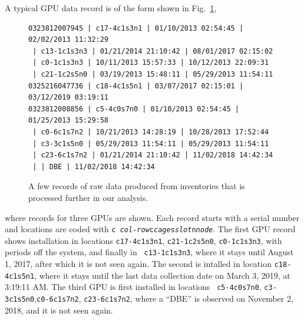 A typical GPU data record is of the form shown in Fig.~\ref{fig:dataraw},
\begin{figure}
{\small
\begin{verbatim}
0323812007945 | c17-4c1s3n1 | 01/10/2013 02:54:45 | 02/02/2013 11:32:29
 | c13-1c1s3n3 | 01/21/2014 21:10:42 | 08/01/2017 02:15:02
 | c0-1c1s3n3 | 10/11/2013 15:57:33 | 10/12/2013 22:09:31
 | c21-1c2s5n0 | 03/19/2013 15:48:11 | 05/29/2013 11:54:11
0325216047736 | c18-4c1s5n1 | 03/07/2017 02:15:01 | 03/12/2019 03:19:11
0323812008856 | c5-4c0s7n0 | 01/10/2013 02:54:45 | 01/25/2013 15:29:58
 | c0-6c1s7n2 | 10/21/2013 14:28:19 | 10/28/2013 17:52:44
 | c3-3c1s5n0 | 05/29/2013 11:54:11 | 05/29/2013 11:54:11
 | c23-6c1s7n2 | 01/21/2014 21:10:42 | 11/02/2018 14:42:34
 | | DBE | 11/02/2018 14:42:34
\end{verbatim}
}
\caption{A few records of raw data produced from inventories that is
  processed further in our analysis.}
\label{fig:dataraw}
\end{figure}
\noindent where records for three GPUs are shown. Each record starts
with a serial number and locations are coded with {\tt c{\it
    col-row}c{\it cage}s{\it slot}n{\it node}}. The first GPU record
shows installation in locations {\tt c17-4c1s3n1}, {\tt c21-1c2s5n0},
{\tt c0-1c1s3n3}, with periods off the system, and finally in {\tt
  c13-1c1s3n3}, where it stays until August 1, 2017, after which it is
not seen again. The second is intalled in location {\tt c18-4c1s5n1},
where it stays until the last data collection date on March 3, 2019,
at 3:19:11 AM. The third GPU is first installed in locations {\tt
  c5-4c0s7n0}, {\tt c3-3c1s5n0},{\tt c0-6c1s7n2}, {\tt c23-6c1s7n2},
where a ``DBE'' is observed on November 2, 2018, and it is not seen
again.
